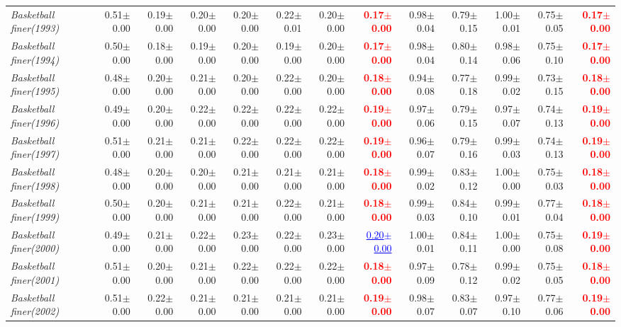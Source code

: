 \documentclass[nohyperref]{article}
\theoremstyle{plain}
\theoremstyle{definition}
\theoremstyle{remark}
\newcommand{\red}[1]{\textcolor{red}{\textbf{#1}}}
\newcommand{\blue}[1]{\textcolor{blue}{\underline{#1}}}
\begin{document}
\begin{table*}[!ht]
{\begin{tabular}{lrr|rrrrr|rrrrr}
			{\it Basketball finer(1993)} & 0.51$\pm$0.00 & 0.19$\pm$0.00 & 0.20$\pm$0.00 & 0.20$\pm$0.00 & 0.22$\pm$0.01 & 0.20$\pm$0.00 & \red{0.17$\pm$0.00} & 0.98$\pm$0.04 & 0.79$\pm$0.15 & 1.00$\pm$0.01 & 0.75$\pm$0.05 & \red{0.17$\pm$0.00} \\
			{\it Basketball finer(1994)} & 0.50$\pm$0.00 & 0.18$\pm$0.00 & 0.19$\pm$0.00 & 0.20$\pm$0.00 & 0.19$\pm$0.00 & 0.20$\pm$0.00 & \red{0.17$\pm$0.00} & 0.98$\pm$0.04 & 0.80$\pm$0.14 & 0.98$\pm$0.06 & 0.75$\pm$0.10 & \red{0.17$\pm$0.00} \\
			{\it Basketball finer(1995)} & 0.48$\pm$0.00 & 0.20$\pm$0.00 & 0.21$\pm$0.00 & 0.20$\pm$0.00 & 0.22$\pm$0.00 & 0.20$\pm$0.00 & \red{0.18$\pm$0.00} & 0.94$\pm$0.08 & 0.77$\pm$0.18 & 0.99$\pm$0.02 & 0.73$\pm$0.15 & \red{0.18$\pm$0.00} \\
			{\it Basketball finer(1996)} & 0.49$\pm$0.00 & 0.20$\pm$0.00 & 0.22$\pm$0.00 & 0.22$\pm$0.00 & 0.22$\pm$0.00 & 0.22$\pm$0.00 & \red{0.19$\pm$0.00} & 0.97$\pm$0.06 & 0.79$\pm$0.15 & 0.97$\pm$0.07 & 0.74$\pm$0.13 & \red{0.19$\pm$0.00} \\
			{\it Basketball finer(1997)} & 0.51$\pm$0.00 & 0.21$\pm$0.00 & 0.21$\pm$0.00 & 0.22$\pm$0.00 & 0.22$\pm$0.00 & 0.22$\pm$0.00 & \red{0.19$\pm$0.00} & 0.96$\pm$0.07 & 0.79$\pm$0.16 & 0.99$\pm$0.03 & 0.74$\pm$0.13 & \red{0.19$\pm$0.00} \\
			{\it Basketball finer(1998)} & 0.48$\pm$0.00 & 0.20$\pm$0.00 & 0.20$\pm$0.00 & 0.21$\pm$0.00 & 0.21$\pm$0.00 & 0.21$\pm$0.00 & \red{0.18$\pm$0.00} & 0.99$\pm$0.02 & 0.83$\pm$0.12 & 1.00$\pm$0.00 & 0.75$\pm$0.03 & \red{0.18$\pm$0.00} \\
			{\it Basketball finer(1999)} & 0.50$\pm$0.00 & 0.20$\pm$0.00 & 0.21$\pm$0.00 & 0.21$\pm$0.00 & 0.22$\pm$0.00 & 0.21$\pm$0.00 & \red{0.18$\pm$0.00} & 0.99$\pm$0.03 & 0.84$\pm$0.10 & 0.99$\pm$0.01 & 0.77$\pm$0.04 & \red{0.18$\pm$0.00} \\
			{\it Basketball finer(2000)} & 0.49$\pm$0.00 & 0.21$\pm$0.00 & 0.22$\pm$0.00 & 0.23$\pm$0.00 & 0.22$\pm$0.00 & 0.23$\pm$0.00 & \blue{0.20$\pm$0.00} & 1.00$\pm$0.01 & 0.84$\pm$0.11 & 1.00$\pm$0.00 & 0.75$\pm$0.08 & \red{0.19$\pm$0.00} \\
			{\it Basketball finer(2001)} & 0.51$\pm$0.00 & 0.20$\pm$0.00 & 0.21$\pm$0.00 & 0.22$\pm$0.00 & 0.22$\pm$0.00 & 0.22$\pm$0.00 & \red{0.18$\pm$0.00} & 0.97$\pm$0.09 & 0.78$\pm$0.12 & 0.99$\pm$0.02 & 0.75$\pm$0.05 & \red{0.18$\pm$0.00} \\
			{\it Basketball finer(2002)} & 0.51$\pm$0.00 & 0.22$\pm$0.00 & 0.21$\pm$0.00 & 0.21$\pm$0.00 & 0.21$\pm$0.00 & 0.21$\pm$0.00 & \red{0.19$\pm$0.00} & 0.98$\pm$0.07 & 0.83$\pm$0.07 & 0.97$\pm$0.10 & 0.77$\pm$0.06 & \red{0.19$\pm$0.00} \\

\end{tabular}}
\end{table*}
\end{document}
